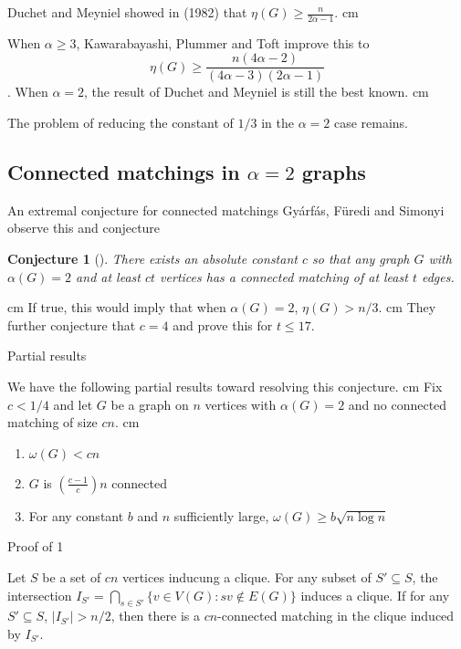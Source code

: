 \documentclass{beamer}
\newtheorem{conjecture}{Conjecture}
\newcommand{\bframe}[2]{\begin{frame}{#1}#2\end{frame}}
\begin{document}
\bframe{}{
 Duchet and Meyniel showed in  \cite{MR671905} (1982) that $\displaystyle\eta(G) \geq \frac{ n}{2\alpha - 1}$.\pause \vskip 0.5 cm 

When $\alpha \geq 3$, Kawarabayashi, Plummer and Toft \cite{MR2156345} improve this to 
\[\eta(G) \geq \frac{n(4\alpha-2)}{(4\alpha-3)(2\alpha -1)}\].   \pause  When $\alpha = 2$, the result of Duchet and Meyniel is still the best known. \pause \vskip 0.5 cm

The problem of reducing the constant of $1/3$ in the $\alpha  = 2 $ case remains. 
}

\subsection{Connected matchings in $\alpha = 2$ graphs}

\bframe{An extremal conjecture for connected matchings}{
  Gy\'arf\'as, F\"uredi and Simonyi observe this and conjecture \pause 
 	\begin{conjecture}[\cite{FGS}]
  		There exists an absolute constant $c$ so that any graph $G$ with $\alpha(G) =2$ and at least $ct$ vertices has a connected matching of at least $t$ edges.
 	\end{conjecture}\vskip 0.5 cm\pause
 	If true, this would imply that when $\alpha(G) = 2$, $\eta(G) > n/3$. \pause\vskip 0.5 cm 
 They further conjecture that $c = 4$ and prove this for $t \leq 17$.}

\bframe{Partial results}{

We have the following partial results toward resolving this conjecture.
\pause \vskip 0.5 cm
Fix $c < 1/4$ and let $G$ be a graph on $n$ vertices with $\alpha(G) = 2$ and no connected matching of size $cn$. \pause \vskip 0.25 cm
\begin{enumerate}
	\item $\omega(G) < cn$ \pause
	\item $G$ is $\displaystyle\left( \frac{c-1}{c}\right)n$ connected \pause
	\item For any constant $b$ and $n$ sufficiently large, $\omega(G) \geq b\sqrt{n\log n}$  
\end{enumerate}
}

\bframe{Proof of 1}{
\pause

Let $S$ be a set of $cn$ vertices inducung a clique. \pause For any subset of $S'\subseteq S$, the intersection $\displaystyle I_{S'} = \bigcap_{s\in S'} \{v \in V(G): sv \notin E(G)\}$ induces a clique. \pause If for any $S'\subseteq S$, $|I_{S'}| > n/2$, then there is a $cn$-connected matching in the clique induced by $I_{S'}$. 
}
\end{document}

